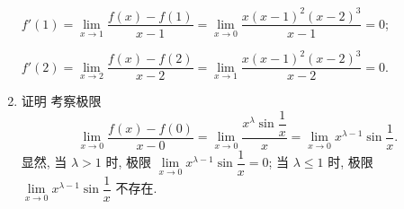 \documentclass[a4paper, 11pt]{ctexart}
\begin{document}
\begin{enumerate}
        $f'(1) = \lim\limits_{x\to1}\dfrac{f(x) - f(1)}{x - 1} = \lim\limits_{x\to0}\dfrac{x(x-1)^2(x-2)^3}{x-1} = 0$;

        $f'(2) = \lim\limits_{x\to2}\dfrac{f(x) - f(2)}{x - 2} = \lim\limits_{x\to1}\dfrac{x(x-1)^2(x-2)^3}{x - 2} = 0$.
    \item %
        {\heiti 证明} 考察极限
        \[
            \lim_{x\to0}\frac{f(x) - f(0)}{x - 0} = \lim_{x\to0}\frac{x^\lambda\sin\dfrac1x}{x} = \lim_{x\to0}x^{\lambda - 1}\sin\frac1x.    
        \]
        显然, 当 $\lambda > 1$ 时, 极限 $\lim\limits_{x\to0}x^{\lambda - 1}\sin\dfrac1x = 0$; 当 $\lambda \leqslant 1$ 时, 极限 $\lim\limits_{x\to0}x^{\lambda - 1}\sin\dfrac1x$ 不存在.
\end{enumerate}
\end{document}

